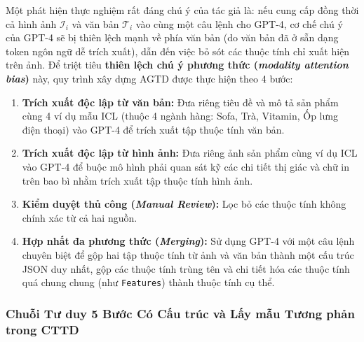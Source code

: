 \documentclass[conference,10pt]{IEEEtran}
\begin{document}
Một phát hiện thực nghiệm rất đáng chú ý của tác giả là: nếu cung cấp đồng thời cả hình ảnh $\mathcal{I}_i$ và văn bản $\mathcal{T}_i$ vào cùng một câu lệnh cho GPT-4, cơ chế chú ý của GPT-4 sẽ bị thiên lệch mạnh về phía văn bản (do văn bản đã ở sẵn dạng token ngôn ngữ dễ trích xuất), dẫn đến việc bỏ sót các thuộc tính chỉ xuất hiện trên ảnh. Để triệt tiêu \textbf{thiên lệch chú ý phương thức (\textit{modality attention bias})} này, quy trình xây dựng AGTD được thực hiện theo 4 bước:
\begin{enumerate}
    \item \textbf{Trích xuất độc lập từ văn bản:} Đưa riêng tiêu đề và mô tả sản phẩm cùng 4 ví dụ mẫu ICL (thuộc 4 ngành hàng: Sofa, Trà, Vitamin, Ốp lưng điện thoại) vào GPT-4 để trích xuất tập thuộc tính văn bản.
    \item \textbf{Trích xuất độc lập từ hình ảnh:} Đưa riêng ảnh sản phẩm cùng ví dụ ICL vào GPT-4 để buộc mô hình phải quan sát kỹ các chi tiết thị giác và chữ in trên bao bì nhằm trích xuất tập thuộc tính hình ảnh.
    \item \textbf{Kiểm duyệt thủ công (\textit{Manual Review}):} Lọc bỏ các thuộc tính không chính xác từ cả hai nguồn.
    \item \textbf{Hợp nhất đa phương thức (\textit{Merging}):} Sử dụng GPT-4 với một câu lệnh chuyên biệt để gộp hai tập thuộc tính từ ảnh và văn bản thành một cấu trúc JSON duy nhất, gộp các thuộc tính trùng tên và chi tiết hóa các thuộc tính quá chung chung (như \texttt{Features}) thành thuộc tính cụ thể.
\end{enumerate}

\subsubsection{Chuỗi Tư duy 5 Bước Có Cấu trúc và Lấy mẫu Tương phản trong CTTD}
\end{document}
